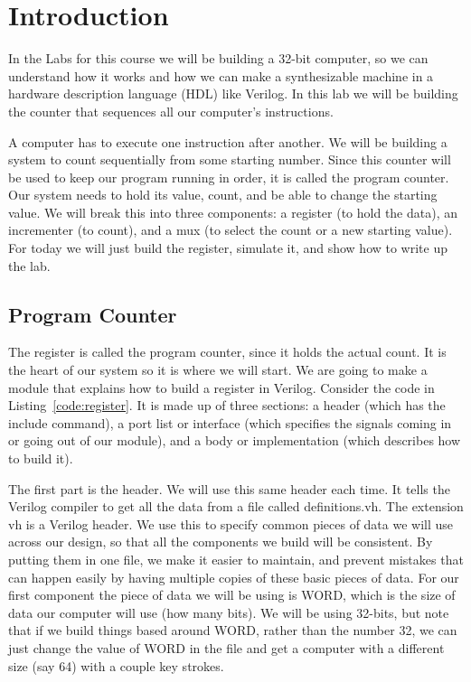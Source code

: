 \chapter{Introduction}

In the Labs for this course we will be building a 32-bit computer, so we can understand how it works and how we can make a synthesizable machine in a hardware description language (HDL) like Verilog.  In this lab we will be building the counter that sequences all our computer's instructions.

A computer has to execute one instruction after another.  We will be building a system to count sequentially from some starting number.  Since this counter will be used to keep our program running in order, it is called the program counter.  Our system needs to hold its value, count, and be able to change the starting value.  We will break this into three components: a register (to hold the data), an incrementer (to count), and a mux (to select the count or a new starting value).  For today we will just build the register, simulate it, and show how to write up the lab.

\section{Program Counter}

The register is called the program counter, since it holds the actual count.  It is the heart of our system so it is where we will start.  We are going to make a module that explains how to build a register in Verilog.  Consider the code in Listing~\ref{code:register}.  It is made up of three sections: a header (which has the include command), a port list or interface (which specifies the signals coming in or going out of our module), and a body or implementation (which describes how to build it).


The first part is the header.  We will use this same header each time.  It tells the Verilog compiler to get all the data from a file called definitions.vh.  The extension vh is a Verilog header.  We use this to specify common pieces of data we will use across our design, so that all the components we build will be consistent.  By putting them in one file, we make it easier to maintain, and prevent mistakes that can happen easily by having multiple copies of these basic pieces of data.  For our first component the piece of data we will be using is WORD, which is the size of data our computer will use (how many bits).  We will be using 32-bits, but note that if we build things based around WORD, rather than the number 32, we can just change the value of WORD in the file and get a computer with a different size (say 64) with a couple key strokes.


